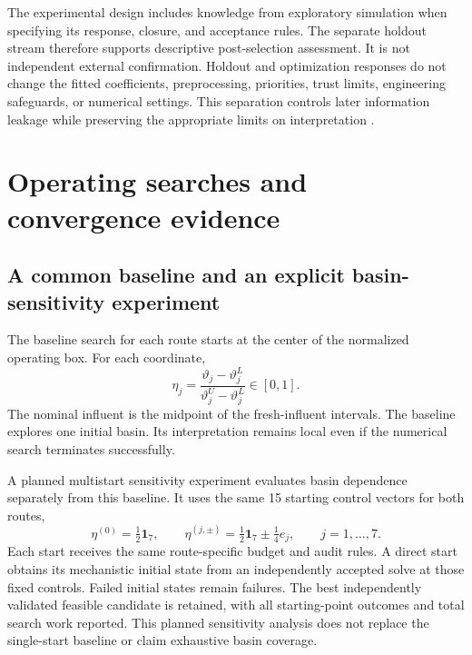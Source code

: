 The experimental design includes knowledge from exploratory simulation when specifying its response, closure, and acceptance rules. The separate holdout stream therefore supports descriptive post-selection assessment. It is not independent external confirmation. Holdout and optimization responses do not change the fitted coefficients, preprocessing, priorities, trust limits, engineering safeguards, or numerical settings. This separation controls later information leakage while preserving the appropriate limits on interpretation \citep{Kaufman2012}.

\section{Operating searches and convergence evidence}

\subsection{A common baseline and an explicit basin-sensitivity experiment}

The baseline search for each route starts at the center of the normalized operating box. For each coordinate,
\begin{equation}
\eta_j=\frac{\vartheta_j-\vartheta_j^L}{\vartheta_j^U-\vartheta_j^L}\in[0,1].
\label{eq:plant_normalized_controls}
\end{equation}
The nominal influent is the midpoint of the fresh-influent intervals. The baseline explores one initial basin. Its interpretation remains local even if the numerical search terminates successfully.

A planned multistart sensitivity experiment evaluates basin dependence separately from this baseline. It uses the same 15 starting control vectors for both routes,
\begin{equation}
\eta^{(0)}=\tfrac12\mathbf1_7,\qquad
\eta^{(j,\pm)}=\tfrac12\mathbf1_7\pm\tfrac14e_j,
\qquad j=1,\ldots,7.
\label{eq:plant_multistart_design}
\end{equation}
Each start receives the same route-specific budget and audit rules. A direct start obtains its mechanistic initial state from an independently accepted solve at those fixed controls. Failed initial states remain failures. The best independently validated feasible candidate is retained, with all starting-point outcomes and total search work reported. This planned sensitivity analysis does not replace the single-start baseline or claim exhaustive basin coverage.

